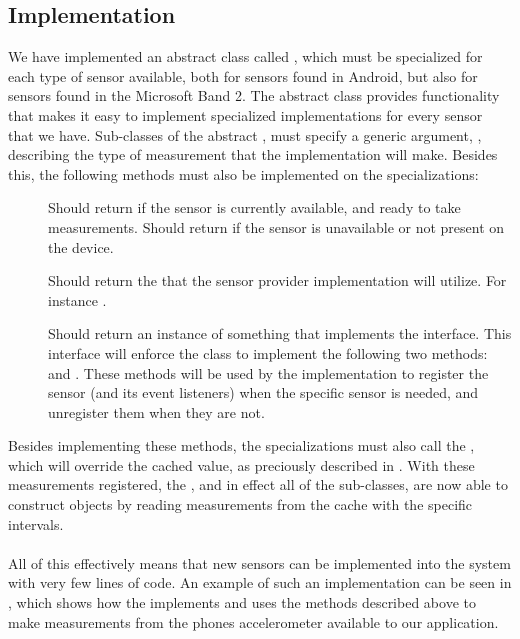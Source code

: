 \subsection{Implementation}
\label{sub:providing_sensor_data_implementation}
We have implemented an abstract class called , which must be specialized for each type of sensor available, both for sensors found in Android, but also for sensors found in the Microsoft Band 2. The abstract class provides functionality that makes it easy to implement specialized implementations for every sensor that we have. Sub-classes of the abstract , must specify a generic argument, , describing the type of measurement that the implementation will make. Besides this, the following methods must also be implemented on the specializations:


\begin{description}
	\item[] Should return  if the sensor is currently available, and ready to take measurements. Should return  if the sensor is unavailable or not present on the device.

	\item[] Should return the  that the sensor provider implementation will utilize. For instance .

	\item[] Should return an instance of something that implements the  interface. This interface will enforce the class to implement the following two methods:  and . These methods will be used by the  implementation to register the sensor (and its event listeners) when the specific sensor is needed, and unregister them when they are not.
\end{description}

Besides implementing these methods, the specializations must also call the , which will override the cached value, as preciously described in . With these measurements registered, the , and in effect all of the sub-classes, are now able to construct  objects by reading measurements from the cache with the specific intervals. 
\\\\
All of this effectively means that new sensors can be implemented into the system with very few lines of code. An example of such an implementation can be seen in , which shows how the  implements and uses the methods described above to make measurements from the phones accelerometer available to our application. 

